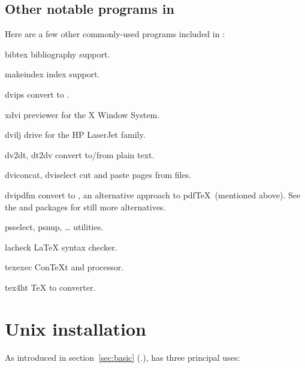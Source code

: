\documentclass{article}
\begin{document}
\subsection{Other notable programs in \protect\TL}

Here are a few other commonly-used programs included in \TL{}:

\begin{cmddescription}

\item [bibtex] bibliography support.

\item [makeindex] index support.

\item [dvips] convert \dvi{} to \PS{}.

\item [xdvi] \dvi{} previewer for the X Window System.

\item [dvilj] \dvi{} drive for the HP LaserJet family.

\item [dv2dt, dt2dv] convert \dvi{} to/from plain text.

\item [dviconcat, dviselect] cut and paste pages
from \dvi{} files.

\item [dvipdfm] convert \dvi{} to , an alternative approach
to pdf\TeX\ (mentioned above).  See the  and
 packages for still more alternatives.

\item [psselect, psnup, \ldots] \PS{}
utilities.

\item [lacheck] \LaTeX{} syntax checker.

\item [texexec] Con\TeX{}t and  processor.

\item [tex4ht] \TeX{} to  converter.  

\end{cmddescription}


\section{Unix installation}
\label{sec:unix-install}

As introduced in section~\ref{sec:basic} (\p.\pageref{sec:basic}),
\TL{} has three principal uses:
\end{document}
